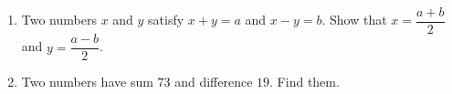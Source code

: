\begin{enumerate}
\item[(a)] Two numbers $x$ and $y$ satisfy $x+y=a$ and $x-y=b$. Show that $x=\dfrac{a+b}{2}$ and $y=\dfrac{a-b}{2}$.
\item[(b)] Two numbers have sum $73$ and difference $19$. Find them.
\end{enumerate}
